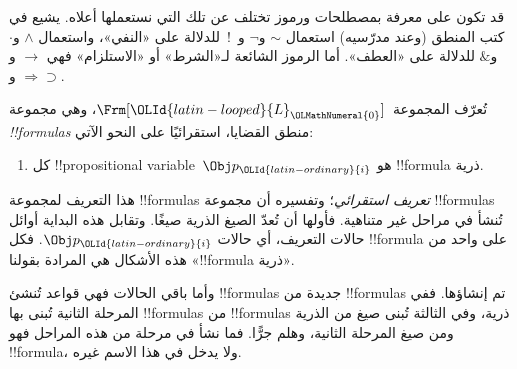 \documentclass[../../../include/open-logic-section]{subfiles}
\begin{document}
\begin{intro}
قد تكون على معرفة بمصطلحات ورموز تختلف عن تلك التي نستعملها أعلاه. يشيع
في كتب المنطق (وعند مدرّسيه) استعمال $\sim$ و$\neg$ و~!\ للدلالة على
«النفي»، واستعمال $\wedge$ و$\cdot$ و$\&$ للدلالة على «العطف». أما
الرموز الشائعة لـ«الشرط» أو «الاستلزام» فهي $\rightarrow$
و$\Rightarrow$ و$\supset$.
\end{intro}

\begin{defn}[الصيغة]
تُعرّف المجموعة~$\Frm[{\OLId{latin-looped}{L}}_{\OLMathNumeral{0}}]$، وهي مجموعة \emph{!!{formula}s} منطق
القضايا، استقرائيًا على النحو الآتي:
\begin{enumerate}


\item كل !!{propositional variable}~$\Obj p_{\OLId{latin-ordinary}{i}}$ هو !!{formula}
  ذرية.






\end{enumerate}
\end{defn}

\begin{explain}
هذا التعريف لمجموعة !!{formula}s \emph{تعريف استقرائي}؛ وتفسيره أن مجموعة
!!{formula}s تُنشأ في مراحل غير متناهية. فأولها أن تُعدّ الصيغ الذرية صيغًا. وتقابل هذه البداية أوائل حالات التعريف، أي حالات
%
%
$\Obj p_{\OLId{latin-ordinary}{i}}$. فكل !!{formula} على واحد من هذه الأشكال هي المرادة بقولنا «!!{formula} ذرية».

وأما باقي الحالات فهي قواعد تُنشئ !!{formula}s جديدة من
!!{formula}s تم إنشاؤها. ففي المرحلة الثانية تُبنى بها
!!{formula}s من !!{formula}s ذرية، وفي الثالثة تُبنى صيغ من الذرية ومن صيغ المرحلة الثانية، وهلم جرًّا. فما نشأ في مرحلة من هذه المراحل فهو
!!{formula}، ولا يدخل في هذا الاسم غيره.
\end{explain}
\end{document}
